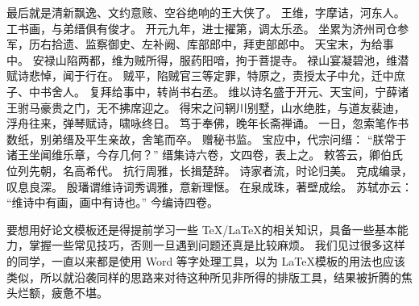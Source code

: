 最后就是清新飘逸、文约意赅、空谷绝响的王大侠了。
王维，字摩诘，河东人。
工书画，与弟缙俱有俊才。
开元九年，进士擢第，调太乐丞。
坐累为济州司仓参军，历右拾遗、监察御史、左补阙、库部郎中，拜吏部郎中。
天宝末，为给事中。
安禄山陷两都，维为贼所得，服药阳喑，拘于菩提寺。
禄山宴凝碧池，维潜赋诗悲悼，闻于行在。
贼平，陷贼官三等定罪，特原之，责授太子中允，迁中庶子、中书舍人。
复拜给事中，转尚书右丞。
维以诗名盛于开元、天宝间，宁薛诸王驸马豪贵之门，无不拂席迎之。
得宋之问辋川别墅，山水绝胜，与道友裴迪，浮舟往来，弹琴赋诗，啸咏终日。
笃于奉佛，晚年长斋禅诵。
一日，忽索笔作书数纸，别弟缙及平生亲故，舍笔而卒。
赠秘书监。
宝应中，代宗问缙：
“朕常于诸王坐闻维乐章，今存几何？”
缙集诗六卷，文四卷，表上之。
敕答云，卿伯氏位列先朝，名高希代。
抗行周雅，长揖楚辞。
诗家者流，时论归美。
克成编录，叹息良深。
殷璠谓维诗词秀调雅，意新理惬。
在泉成珠，著壁成绘。
苏轼亦云：
“维诗中有画，画中有诗也。”
今编诗四卷。

要想用好论文模板还是得提前学习一些 \TeX/\LaTeX{}的相关知识，具备一些基本能力，掌握一些常见技巧，否则一旦遇到问题还真是比较麻烦。
我们见过很多这样的同学，一直以来都是使用 Word 等字处理工具，以为 \LaTeX{}模板的用法也应该类似，所以就沿袭同样的思路来对待这种所见非所得的排版工具，结果被折腾的焦头烂额，疲惫不堪。

